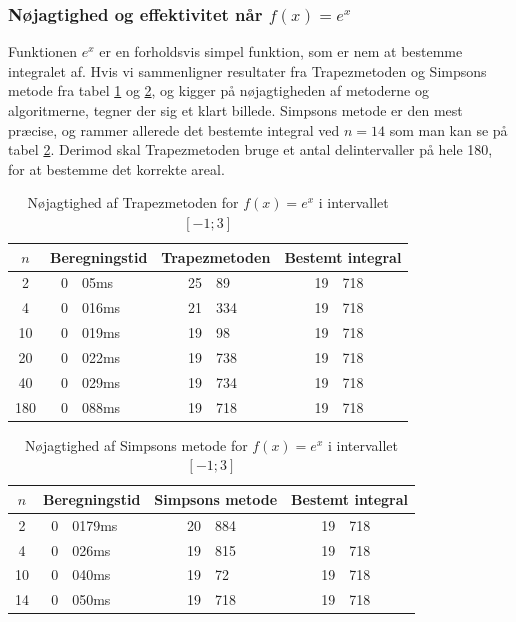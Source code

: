 \documentclass[12pt]{article}
\numberwithin{equation}{section}
\begin{document}
\subsubsection{Nøjagtighed og effektivitet når $f(x)=e^x$}
Funktionen $e^x$ er en forholdsvis simpel funktion, som er nem at bestemme integralet af. Hvis vi sammenligner resultater fra Trapezmetoden og Simpsons metode fra tabel \ref{tab:trapezmetodenex} og \ref{tab:simpsonsmetodeex}, og kigger på nøjagtigheden af metoderne og algoritmerne, tegner der sig et klart billede. Simpsons metode er den mest præcise, og rammer allerede det bestemte integral ved $n=14$ som man kan se på tabel \ref{tab:simpsonsmetodeex}. Derimod skal Trapezmetoden bruge et antal delintervaller på hele 180, for at bestemme det korrekte areal.
\begin{table}[H]
	\caption {Nøjagtighed af Trapezmetoden for $f(x)=e^x$ i intervallet $[-1;3]$}
	\label{tab:trapezmetodenex}
\begin{center}
\begin{tabular}{|c|r@{.}l|r @{.} l|r @{.} l|}
	\hline $n$ & \multicolumn{2}{|c|}{Beregningstid} & \multicolumn{2}{|c|}{Trapezmetoden} & \multicolumn{2}{|c|}{Bestemt integral}
	\\
	\hline 2 & 0&05ms & 25&89 & 19&718\\ 
	\hline 4 & 0&016ms & 21&334 & 19&718\\ 
	\hline 10 & 0&019ms & 19&98 & 19&718\\ 
	\hline 20 & 0&022ms & 19&738 & 19&718\\ 
	\hline 40 & 0&029ms & 19&734 & 19&718\\ 
	\hline 180 & 0&088ms & 19&718 & 19&718\\ 
	\hline 
\end{tabular}
\end{center}
\end{table}
\begin{table}[H]
	\caption {Nøjagtighed af Simpsons metode for $f(x)=e^x$ i intervallet $[-1;3]$} 
	\label{tab:simpsonsmetodeex}
	\begin{center}
		\begin{tabular}{|c|r@{.}l|r @{.} l|r @{.} l|}
			\hline $n$ & \multicolumn{2}{|c|}{Beregningstid} & \multicolumn{2}{|c|}{Simpsons metode} & \multicolumn{2}{|c|}{Bestemt integral}
			\\ 
			\hline 2 & 0&0179ms & 20&884 & 19&718\\ 
			\hline 4 & 0&026ms & 19&815 & 19&718\\ 
			\hline 10 & 0&040ms & 19&72 & 19&718\\ 
			\hline 14 & 0&050ms & 19&718 & 19&718\\ 
			\hline 
		\end{tabular}
	\end{center}
\end{table}
\end{document}
